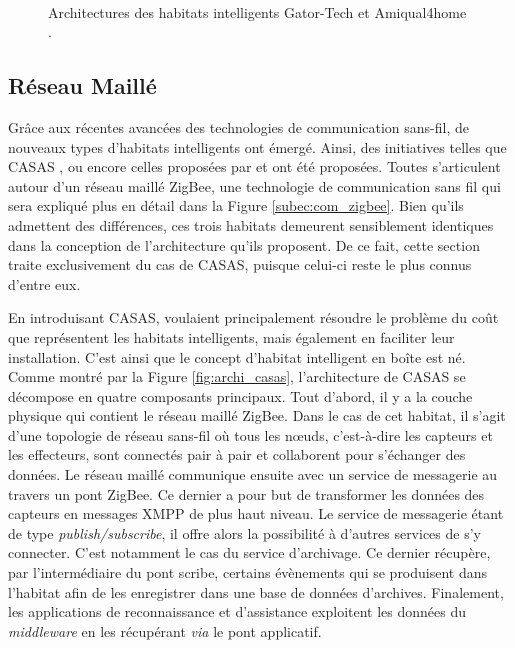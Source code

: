 \begin{figure}[H]
	\centering
	\\[20pt]
	\caption[Architectures des habitats intelligents Gator-Tech et Amiqual4home.]{Architectures des habitats intelligents Gator-Tech \citep{Helal2005} et Amiqual4home \citep{Lago2017}.}
\end{figure}

\subsection{Réseau Maillé}

Grâce aux récentes avancées des technologies de communication sans-fil, de nouveaux types d'habitats intelligents ont émergé. Ainsi, des initiatives telles que CASAS \citep{Cook2013}, ou encore celles proposées par \cite{Zhihua2016} et \cite{Zhenyu2011} ont été proposées. Toutes s'articulent autour d'un réseau maillé ZigBee, une technologie de communication sans fil qui sera expliqué plus en détail dans la Figure \ref{subec:com_zigbee}. Bien qu'ils admettent des différences, ces trois habitats demeurent sensiblement identiques dans la conception de l'architecture qu'ils proposent. De ce fait, cette section traite exclusivement du cas de CASAS, puisque celui-ci reste le plus connus d'entre eux.

En introduisant CASAS, \cite{Cook2013} voulaient principalement résoudre le problème du coût que représentent les habitats intelligents, mais également en faciliter leur installation. C'est ainsi que le concept d'habitat intelligent en boîte est né. Comme montré par la Figure \ref{fig:archi_casas}, l'architecture de CASAS se décompose en quatre composants principaux. Tout d'abord, il y a la couche physique qui contient le réseau maillé ZigBee. Dans le cas de cet habitat, il s'agit d'une topologie de réseau sans-fil où tous les n\oe{}uds, c'est-à-dire les capteurs et les effecteurs, sont connectés pair à pair et collaborent pour s'échanger des données. Le réseau maillé communique ensuite avec un service de messagerie au travers un pont ZigBee. Ce dernier a pour but de transformer les données des capteurs en messages \ac{XMPP} de plus haut niveau. Le service de messagerie étant de type \textit{publish/subscribe}, il offre alors la possibilité à d'autres services de s'y connecter. C'est notamment le cas du service d'archivage. Ce dernier récupère, par l'intermédiaire du pont scribe, certains évènements qui se produisent dans l'habitat afin de les enregistrer dans une base de données d'archives. Finalement, les applications de reconnaissance et d'assistance exploitent les données du \textit{middleware} en les récupérant \textit{via} le pont applicatif.

